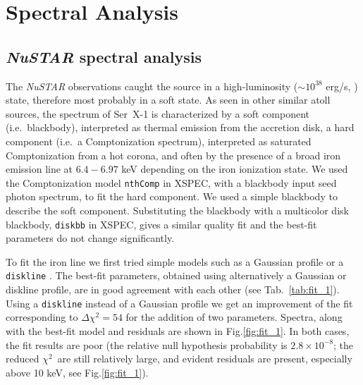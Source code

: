 \documentclass{aa}
\begin{document}



\section{Spectral Analysis}

\subsection{\emph{NuSTAR} spectral analysis}
\label{sec:spec} 

The \emph{NuSTAR} observations caught the source in a high-luminosity
($\sim 10^{38}$ erg/s, \citet{Miller.etal:13}) state, therefore 
most probably in a soft state. 
As seen in other similar atoll sources, the spectrum of Ser~X-1 is 
characterized by a soft component (i.e.\ blackbody), interpreted as
thermal  emission from the accretion disk, a hard component (i.e.\ 
a Comptonization spectrum), interpreted as saturated Comptonization 
from a hot corona, and often by the presence of a broad iron emission 
line at $6.4-6.97$ keV depending on the iron ionization state. We 
used the Comptonization model \texttt{nthComp} \citep{Zycki.etal:99} 
in XSPEC, with a blackbody input seed photon spectrum, 
to fit the hard component. 
We used a simple blackbody to describe the soft component. 
Substituting the blackbody with a multicolor disk blackbody, 
\texttt{diskbb} in XSPEC, gives a similar quality fit and the 
best-fit parameters do not change significantly.  

To fit the iron line we first tried simple models such as a Gaussian 
profile or a \texttt{diskline} \citep{Fabian.etal:89}. 
The best-fit parameters, obtained using alternatively a Gaussian 
or diskline profile, are in good agreement with each other (see Tab.\
\ref{tab:fit_1}). 
Using a \texttt{diskline} instead of a Gaussian profile we get an improvement 
of the fit corresponding to $\Delta \chi^2 = 54$ for the addition of two parameters. 
Spectra, along with the best-fit model and residuals are shown in 
Fig.\ref{fig:fit_1}. In both cases, the fit results are poor (the relative 
null hypothesis probability is $2.8 \times 10^{-8}$; the reduced $\chi^{2}\,$ 
are still relatively large, and evident residuals are present, especially 
above 10 keV, see Fig.\ref{fig:fit_1}).
\end{document}
